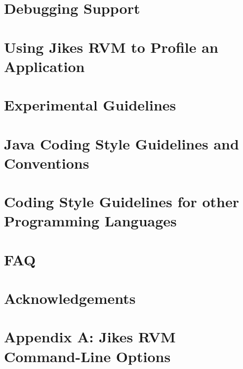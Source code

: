 \documentclass{article}
\newcommand{\jrvm}{Jikes RVM}
\begin{document}
\T \newpage
{}
\section{Debugging Support}
\label{section:debugging}


\T \newpage
{}
\section{Using \jrvm{} to Profile an Application}


\T \newpage
{}
\section{Experimental Guidelines}


\T \newpage
{}
\section{Java Coding Style Guidelines and Conventions}
\label{section:javacodingstyle}


\T \newpage
{}
\section{Coding Style Guidelines for other Programming Languages}
\label{section:codingstyle-nonjava}


\T \newpage
{}
\section{FAQ}


\T \newpage
\section*{Acknowledgements}


\T \newpage
\T 
\T 

\T \newpage

\T \appendix

\section{Appendix A: Jikes RVM Command-Line Options}
\label{appendix:nonadaptive:cmdline}

\end{document}
